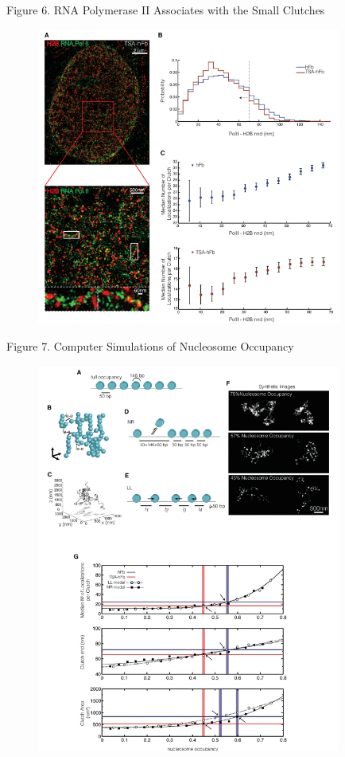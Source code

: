 \documentclass{beamer}			%
\begin{document}
\begin{frame}{Figure 6. RNA Polymerase II Associates with the Small Clutches}
\begin{figure}
\includegraphics[width=10cm]{Figure-6.png}
\end{figure}
\end{frame}

\begin{frame}{Figure 7. Computer Simulations of Nucleosome Occupancy}
\begin{figure}
\includegraphics[width=10cm]{Figure-7.png}
\end{figure}
\end{frame}
\end{document}
